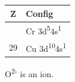 {\def\LTcaptype{none} %
\begin{longtable}[]{@{}cl@{}}
\toprule\noalign{}
Z & Config \\
\midrule\noalign{}
\endhead
\bottomrule\noalign{}
\endlastfoot
24 & Cr 3d\textsuperscript{5}4s\textsuperscript{1} \\
29 & Cu 3d\textsuperscript{10}4s\textsuperscript{1} \\
\end{longtable}
}

O\textsuperscript{2-} is an ion.

